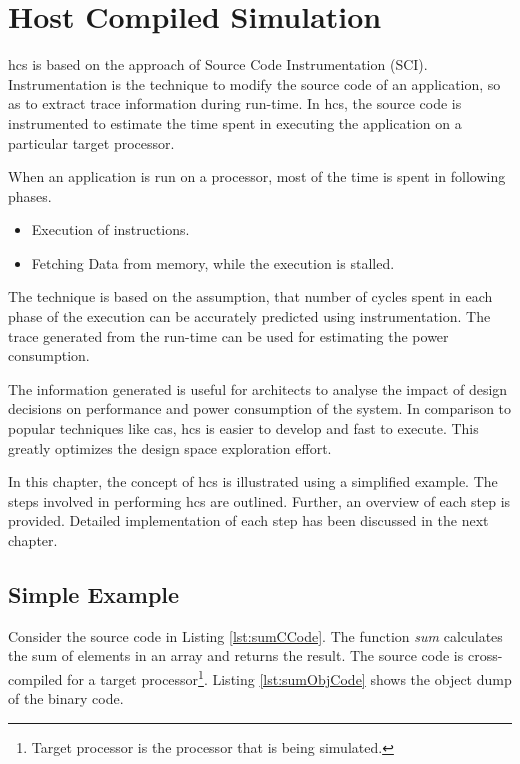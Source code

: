\chapter{Host Compiled Simulation}

\gls{hcs} is based on the approach of Source Code Instrumentation (SCI). Instrumentation is the technique to modify the source code of an application, so as to extract trace information during run-time. In \gls{hcs}, the source code is instrumented to estimate the time spent in executing the application on a particular target processor. 

When an application is run on a processor, most of the time is spent in following phases.
\begin{itemize} \itemsep -6pt
\item Execution of instructions.
\item Fetching Data from memory, while the execution is stalled.
\end{itemize}

The technique is based on the assumption, that number of cycles spent in each phase of the execution can be accurately predicted using instrumentation. The trace generated from the run-time can be used for estimating the power consumption.

The information generated is useful for architects to analyse the impact of design decisions on performance and power consumption of the system. In comparison to popular techniques like \gls{cas}, \gls{hcs} is easier to develop and fast to execute. This greatly optimizes the design space exploration effort.

In this chapter, the concept of \gls{hcs} is illustrated using a simplified example. The steps involved in performing \gls{hcs} are outlined. Further, an overview of each step is provided. Detailed implementation of each step has been discussed in the next chapter.

\section{Simple Example}

Consider the source code in Listing \ref{lst:sumCCode}. The function \emph{sum} calculates the sum of elements in an array and returns the result. The source code is cross-compiled for a target processor\footnote{Target processor is the processor that is being simulated.}. Listing \ref{lst:sumObjCode} shows the object dump of the binary code. 

